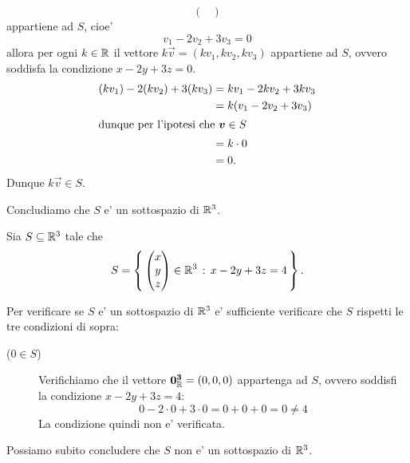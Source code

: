 \begin{example}
\begin{description}
\[\begin{pmatrix}
            \end{pmatrix}
        \] appartiene ad $S$, cioe' \[
            v_1 - 2v_2 + 3v_3 = 0
        \] allora per ogni $k \in \R$ il vettore $k\vec{v} = (kv_1, kv_2, kv_3)$ appartiene ad $S$, ovvero soddisfa la condizione $x -2y + 3z = 0$. \begin{align*}
            (kv_1) -2(kv_2) + 3(kv_3) &= kv_1 -2kv_2 + 3kv_3 \\
            &= k(v_1 -2v_2 +3v_3)\\
            \intertext{dunque per l'ipotesi che $\vec v \in S$}
            &= k \cdot 0\\
            &= 0.
        \end{align*}
        Dunque $k\vec v \in S$.
    \end{description}
    Concludiamo che $S$ e' un sottospazio di $\R^3$.
\end{example}

\begin{example}
    Sia $S \subseteq \R^3$ tale che \[
        S = \set{ \begin{pmatrix}
            x \\ y \\ z
        \end{pmatrix} \in \R^3 \suchthat x -2y + 3z = 4}.
    \]

    Per verificare se $S$ e' un sottospazio di $\R^3$ e' sufficiente verificare che $S$ rispetti le tre condizioni di sopra:
    \begin{description}
        \item[($0 \in S$)] Verifichiamo che il vettore $\vec{0_\R^3} = (0, 0, 0)$ appartenga ad $S$, ovvero soddisfi la condizione $x -2y + 3z = 4$: \[
            0 -2\cdot 0 + 3 \cdot 0 = 0 + 0 + 0 = 0 \neq 4
        \] La condizione quindi non e' verificata.
    \end{description}
    Possiamo subito concludere che $S$ non e' un sottospazio di $\R^3$.
\end{example}


